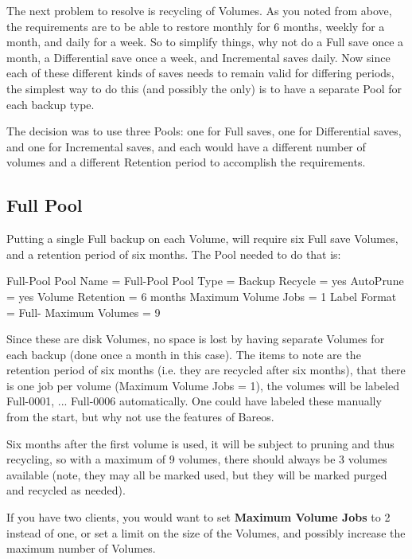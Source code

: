 The next problem to resolve is recycling of Volumes. As you noted from above,
the requirements are to be able to restore monthly for 6 months, weekly for a
month, and daily for a week. So to simplify things, why not do a Full save
once a month, a Differential save once a week, and Incremental saves daily.
Now since each of these different kinds of saves needs to remain valid for
differing periods, the simplest way to do this (and possibly the only) is to
have a separate Pool for each backup type.

The decision was to use three Pools: one for Full saves, one for Differential
saves, and one for Incremental saves, and each would have a different number
of volumes and a different Retention period to accomplish the requirements.

\label{FullPool}
\subsection{Full Pool}

Putting a single Full backup on each Volume, will require six Full save
Volumes, and a retention period of six months. The Pool needed to do that is:

\begin{bconfig}{Full-Pool}
Pool {
  Name = Full-Pool
  Pool Type = Backup
  Recycle = yes
  AutoPrune = yes
  Volume Retention = 6 months
  Maximum Volume Jobs = 1
  Label Format = Full-
  Maximum Volumes = 9
}
\end{bconfig}

Since these are disk Volumes, no space is lost by having separate Volumes for
each backup (done once a month in this case). The items to note are the
retention period of six months (i.e. they are recycled after six months), that
there is one job per volume (Maximum Volume Jobs = 1), the volumes will be
labeled Full-0001, ... Full-0006 automatically. One could have labeled these
manually from the start, but why not use the features of Bareos.

Six months after the first volume is used, it will be subject to pruning
and thus recycling, so with a maximum of 9 volumes, there should always be
3 volumes available (note, they may all be marked used, but they will be
marked purged and recycled as needed).

If you have two clients, you would want to set {\bf Maximum Volume Jobs} to
2 instead of one, or set a limit on the size of the Volumes, and possibly
increase the maximum number of Volumes.


